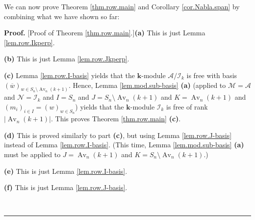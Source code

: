 \documentclass[numbers=enddot,12pt,final,onecolumn,notitlepage]{scrartcl}%
\numberwithin{exer}{subsection}
\theoremstyle{definition}
\newenvironment{proof}[1][Proof]{\noindent\textbf{#1.} }{\ \rule{0.5em}{0.5em}}
\begin{document}
We can now prove Theorem \ref{thm.row.main} and Corollary \ref{cor.Nabla.span}
by combining what we have shown so far:

\begin{proof}
[Proof of Theorem \ref{thm.row.main}.]\textbf{(a)} This is just Lemma
\ref{lem.row.Ikperp}. \medskip

\textbf{(b)} This is just Lemma \ref{lem.row.Jkperp}. \medskip

\textbf{(c)} Lemma \ref{lem.row.I-basis} yields that the $\mathbf{k}$-module
$\mathcal{A}/\mathcal{I}_{k}$ is free with basis $\left(  \overline{w}\right)
_{w\in S_{n}\setminus\operatorname*{Av}\nolimits_{n}\left(  k+1\right)  }$.
Hence, Lemma \ref{lem.mod.sub-basis} \textbf{(a)} (applied to $\mathcal{M}%
=\mathcal{A}$ and $\mathcal{N}=\mathcal{I}_{k}$ and $I=S_{n}$ and
$J=S_{n}\setminus\operatorname*{Av}\nolimits_{n}\left(  k+1\right)  $ and
$K=\operatorname*{Av}\nolimits_{n}\left(  k+1\right)  $ and $\left(
m_{i}\right)  _{i\in I}=\left(  w\right)  _{w\in S_{n}}$) yields that the
$\mathbf{k}$-module $\mathcal{I}_{k}$ is free of rank $\left\vert
\operatorname*{Av}\nolimits_{n}\left(  k+1\right)  \right\vert $. This proves
Theorem \ref{thm.row.main} \textbf{(c)}. \medskip

\textbf{(d)} This is proved similarly to part \textbf{(c)}, but using Lemma
\ref{lem.row.J-basis} instead of Lemma \ref{lem.row.I-basis}. (This time,
Lemma \ref{lem.mod.sub-basis} \textbf{(a)} must be applied to
$J=\operatorname*{Av}\nolimits_{n}\left(  k+1\right)  $ and $K=S_{n}%
\setminus\operatorname*{Av}\nolimits_{n}\left(  k+1\right)  $.) \medskip

\textbf{(e)} This is just Lemma \ref{lem.row.I-basis}. \medskip

\textbf{(f)} This is just Lemma \ref{lem.row.J-basis}. \medskip


\end{proof}
\end{document}
